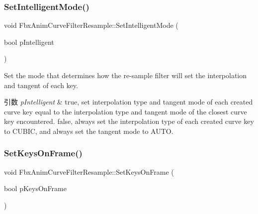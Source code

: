 \mbox{\label{class_fbx_anim_curve_filter_resample_a8ac3cafa7fe863a9d3205452f6f15c49}} 
\subsubsection{\texorpdfstring{Set\+Intelligent\+Mode()}{SetIntelligentMode()}}
{\footnotesize\ttfamily void Fbx\+Anim\+Curve\+Filter\+Resample\+::\+Set\+Intelligent\+Mode (\begin{DoxyParamCaption}\item[{bool}]{p\+Intelligent }\end{DoxyParamCaption})}

Set the mode that determines how the re-\/sample filter will set the interpolation and tangent of each key. 
\begin{DoxyParams}{引数}
{\em p\+Intelligent} & {\ttfamily true}, set interpolation type and tangent mode of each created curve key equal to the interpolation type and tangent mode of the closest curve key encountered. {\ttfamily false}, always set the interpolation type of each created curve key to C\+U\+B\+IC, and always set the tangent mode to A\+U\+TO. \\
\hline
\end{DoxyParams}
\mbox{\label{class_fbx_anim_curve_filter_resample_abb2e4701aa3e44d945cfa92254aabbb0}} 
\subsubsection{\texorpdfstring{Set\+Keys\+On\+Frame()}{SetKeysOnFrame()}}
{\footnotesize\ttfamily void Fbx\+Anim\+Curve\+Filter\+Resample\+::\+Set\+Keys\+On\+Frame (\begin{DoxyParamCaption}\item[{bool}]{p\+Keys\+On\+Frame }\end{DoxyParamCaption})}

